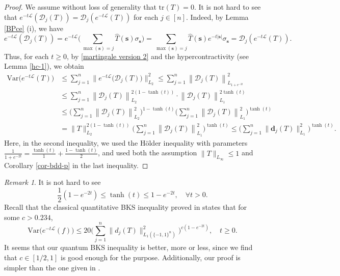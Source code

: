 \documentclass{amsbook}
\theoremstyle{definition}
\theoremstyle{remark}
\newtheorem{remark}[theorem]{Remark}
\numberwithin{section}{chapter}
\numberwithin{equation}{chapter}
\newcommand{\1}{\mathbf{1}}
\newcommand{\s}{\mathbf{s}}
\newcommand{\dc}{\mathbf{d}}
\begin{document}
\begin{proof}
	We assume without loss of generality that $\mathrm{tr}(T)=0$. 
	It is not hard to see that $e^{-t\mathcal{L}}(\mathcal{D}_{j}(T))=\mathcal{D}_{j}(e^{-t\mathcal{L}}(T))$ for each $j\in [n]$. Indeed, by Lemma \ref{BPce} (i), we have
	\[
	e^{-t\mathcal{L}}\left(\mathcal{D}_{j}(T)\right)=e^{-t\mathcal{L}}\Big(\sum_{\max(\s)=j}\widehat{T}(\s)\sigma_{\s}\Big)=\sum_{\max(\s)=j}\widehat{T}(\s)e^{-t|\s|}\sigma_{\s}=\mathcal{D}_{j}(e^{-t\mathcal{L}}(T)).
	\]
	Thus, for each $t\geq 0$, by \eqref{martingale version 2} and the hypercontractivity (see Lemma \ref{hc-1}), we obtain
	\begin{align*}
		\mathrm{Var}\big(e^{-t\mathcal{L}}(T)\big)&\leq\sum_{j=1}^{n}\big\|e^{-t\mathcal{L}}\big(\mathcal{D}_{j}(T)\big)\big\|^{2}_{L_{2}}\leq \sum_{j=1}^{n}\left\|\mathcal{D}_{j}(T)\right\|^{2}_{L_{1+e^{-2t}}}\\
		&\leq \sum_{j=1}^{n}\left\|\mathcal{D}_{j}(T)\right\|^{2(1-\tanh(t))}_{L_{2}}\cdot\left\|\mathcal{D}_{j}(T)\right\|^{2\tanh(t)}_{L_{1}}\\
		&\leq \Big(\sum_{j=1}^{n}\left\|\mathcal{D}_{j}(T)\right\|^{2}_{L_{2}}\Big)^{1-\tanh(t)}\Big(\sum_{j=1}^{n}\left\|\mathcal{D}_{j}(T)\right\|^{2}_{L_{1}}\Big)^{\tanh(t)}\\
		&=\|T\|^{2(1-\tanh(t))}_{L_{2}}\Big(\sum_{j=1}^{n}\left\|\mathcal{D}_{j}(T)\right\|^{2}_{L_{1}}\Big)^{\tanh(t)}\leq\Big(\sum_{j=1}^{n}\|\dc_{j}(T)\|^{2}_{L_{1}}\Big)^{\tanh(t)}.
	\end{align*}
Here, in the second inequality, we used the H\"older inequality with parameters $\frac{1}{1+e^{-2t}}=\frac{\tanh(t)}{1}+\frac{1-\tanh(t)}{2}$, and used both the assumption $\|T\|_{L_{\infty}}\leq 1$ and Corollary \ref{cor-bdd-p} in the last inequality.
\end{proof}


\begin{remark}
It is not hard to see 
$$\frac{1}{2}(1-e^{-2t})\leq \tanh(t)\leq 1-e^{-2t},\quad \forall t>0.$$
Recall that the classical quantitative BKS inequality proved in   \cite[Theorem 4]{KK2013} states that for some $c>0.234$,
\[\mathrm{Var}\big(e^{-t\mathcal{L}}(f)\big)\leq 20 \Big(\sum\limits_{j=1}^{n}\|d_{j}(T)\|^{2}_{L_{1}(\{-1,1\}^n)}\Big)^{c (1-e^{-2t})},\quad t\geq 0.\]
It seems that our quantum BKS inequality is better, more or less, since we find that $c\in [1/2,1]$ is good enough for the purpose. Additionally, our proof is simpler than the one given in \cite{KK2013}. 
\end{remark}
\end{document}
